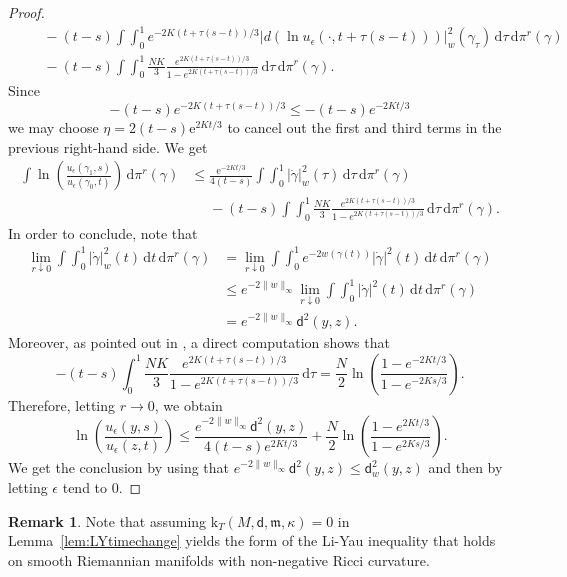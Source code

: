 \documentclass[10pt]{article}
\newcommand{\m}{\mathfrak{m}}
\renewcommand{\d}{\,\mathrm{d}}
\newcommand{\e}{\mathrm{e}}
\renewcommand{\k}{\mathrm{k}}
\newcommand{\dist}{\mathsf{d}}
\theoremstyle{plain}
\theoremstyle{definition}
\newtheorem{remark}[theorem]{Remark}
\begin{document}
\begin{proof}
\begin{align*}
    & \phantom{=} - (t-s) \int \int_0^1 e^{-2K(t + \tau(s-t))/3}|d(\ln u_\epsilon(\cdot,t + \tau(s-t)) )|_{w}^2(\gamma_\tau) \d \tau \d \pi^r(\gamma) \\
    & \phantom{=}- (t-s) \int \int_0^1 \frac{NK}{3}\frac{e^{2K(t + \tau(s-t))/3}}{1-e^{2K(t + \tau(s-t))/3}}  \d \tau \d \pi^r(\gamma).
\end{align*}
Since
\[
- (t-s) e^{-2K(t + \tau(s-t))/3} \le - (t-s) e^{-2Kt/3}
\]
we may choose $\eta=2(t-s)\e^{2Kt/3}$ to cancel out the first and third terms in the previous right-hand side. We get
\begin{align*}
    \int \ln \left( \frac{u_\epsilon(\gamma_1,s)}{u_\epsilon(\gamma_0,t)}\right) \d \pi^r(\gamma) & \le 
    \frac{\e^{-2Kt/3}}{4(t-s)} \int \int_0^1 |\dot{\gamma}|_{w}^2(\tau) \d \tau \d \pi^r(\gamma)
    \\
    &\phantom{=}- (t-s) \int \int_0^1 \frac{N K}{3}\frac{e^{2K(t + \tau(s-t))/3}}{1-e^{2K(t + \tau(s-t))/3}}  \d \tau \d \pi^r(\gamma).\nonumber
\end{align*}
In order to conclude, note that
\begin{align*}
\lim\limits_{r \downarrow 0} \int \int_0^1 |\dot{\gamma}|_{w}^2(t) \d t  \d \pi^r (\gamma) & = \lim\limits_{r \downarrow 0} \int \int_0^1 e^{-2w(\gamma(t))}|\dot{\gamma}|^2(t) \d t  \d \pi^r (\gamma)\\
& \le e^{-2 \|w\|_\infty} \lim\limits_{r \downarrow 0} \int \int_0^1 |\dot{\gamma}|^2(t) \d t  \d \pi^r (\gamma) \\
& = e^{-2 \|w\|_\infty} \dist^2(y,z).
\end{align*}
Moreover, as pointed out in \cite{GarofaloMondino-13}, a direct computation shows that
\[
-(t-s) \int_0^1 \frac{N K}{3}\frac{e^{2K(t + \tau(s-t))/3}}{1-e^{2K(t + \tau(s-t))/3}}  \d \tau  = \frac{N}{2} \ln \left( \frac{1-e^{-2Kt/3}}{1-e^{-2Ks/3}} \right). 
\]
Therefore, letting $r \to 0$, we obtain
\[
\ln \left( \frac{u_\epsilon(y,s)}{u_\epsilon(z,t)}\right) \le \frac{e^{-2 \|w\|_\infty} \dist^2(y,z)}{4(t-s)e^{2Kt/3}} + \frac{N}{2} \ln \left( \frac{1-e^{2Kt/3}}{1-e^{2Ks/3}} \right).
\]
We get the conclusion by using that $e^{-2 \|w\|_\infty} \dist^2(y,z) \le \dist_w^2(y,z)$ and then by letting $\epsilon$ tend to $0$. 
\end{proof}


\begin{remark}
    Note that assuming $\k_T(M,\dist,\m,\kappa) = 0$ in Lemma~\ref{lem:LYtimechange} yields the form of the Li-Yau inequality that holds on smooth Riemannian manifolds with non-negative Ricci curvature.
\end{remark}
\end{document}
